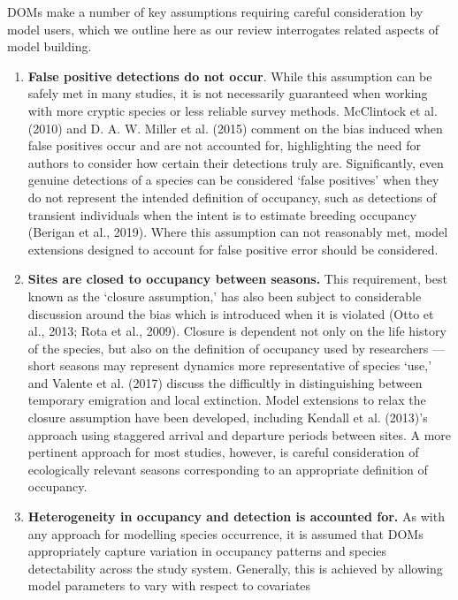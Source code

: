 \documentclass[
]{article}
\begin{document}
DOMs make a number of key assumptions requiring careful consideration by
model users, which we outline here as our review interrogates related
aspects of model building.

\begin{enumerate}
\def\labelenumi{\Roman{enumi}.}
\item
  \textbf{False positive detections do not occur}. While this assumption
  can be safely met in many studies, it is not necessarily guaranteed
  when working with more cryptic species or less reliable survey
  methods. McClintock et al. (2010) and D. A. W. Miller et al. (2015)
  comment on the bias induced when false positives occur and are not
  accounted for, highlighting the need for authors to consider how
  certain their detections truly are. Significantly, even genuine
  detections of a species can be considered `false positives' when they
  do not represent the intended definition of occupancy, such as
  detections of transient individuals when the intent is to estimate
  breeding occupancy (Berigan et al., 2019). Where this assumption can
  not reasonably met, model extensions designed to account for false
  positive error should be considered.
\item
  \textbf{Sites are closed to occupancy between seasons.} This
  requirement, best known as the `closure assumption,' has also been
  subject to considerable discussion around the bias which is introduced
  when it is violated (Otto et al., 2013; Rota et al., 2009). Closure is
  dependent not only on the life history of the species, but also on the
  definition of occupancy used by researchers --- short seasons may
  represent dynamics more representative of species `use,' and Valente
  et al. (2017) discuss the difficultly in distinguishing between
  temporary emigration and local extinction. Model extensions to relax
  the closure assumption have been developed, including Kendall et al.
  (2013)'s approach using staggered arrival and departure periods
  between sites. A more pertinent approach for most studies, however, is
  careful consideration of ecologically relevant seasons corresponding
  to an appropriate definition of occupancy.
\item
  \textbf{Heterogeneity in occupancy and detection is accounted for.} As
  with any approach for modelling species occurrence, it is assumed that
  DOMs appropriately capture variation in occupancy patterns and species
  detectability across the study system. Generally, this is achieved by
  allowing model parameters to vary with respect to covariates

\end{enumerate}
\end{document}
